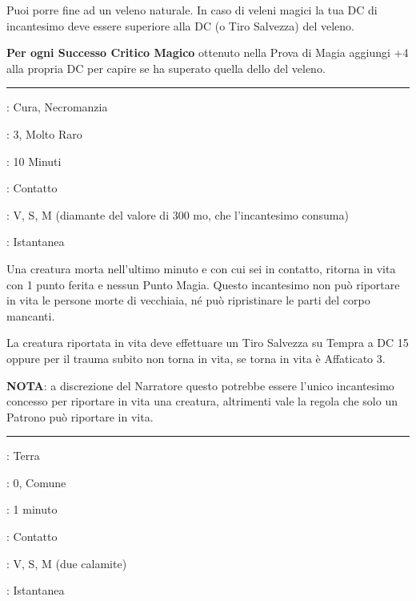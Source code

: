 \begin{multicols}{2}
Puoi porre fine ad un veleno naturale. In caso di veleni magici la tua DC di incantesimo deve essere superiore alla DC (o Tiro Salvezza) del veleno.

\textbf{Per ogni Successo Critico Magico} ottenuto nella Prova di Magia aggiungi +4 alla propria DC per capire se ha superato quella dello del veleno.

\smallskip\noindent\rule{\linewidth}{2pt} \hypertarget{Rinascita}{}\medskip{}
\noindent
\begin{description}[noitemsep, topsep=0pt, parsep=0pt, partopsep=0pt, leftmargin=0cm, labelwidth=2.8cm]
	\item[\textbf{Lista di Magia}]: Cura, Necromanzia
	\item[\textbf{Livello}]: 3, Molto Raro
	\item[\textbf{T. di Lancio}]: 10 Minuti
	\item[\textbf{Gittata}]: Contatto
	\item[\textbf{Componenti}]: V, S, M (diamante del valore di 300 mo, che l'incantesimo consuma)
	\item[\textbf{Durata}]: Istantanea
\end{description}

Una creatura morta nell'ultimo minuto e con cui sei in contatto, ritorna in vita con 1 punto ferita e nessun Punto Magia. Questo incantesimo non può riportare in vita le persone morte di vecchiaia, né può ripristinare le parti del corpo mancanti.

La creatura riportata in vita deve effettuare un Tiro Salvezza su Tempra a DC 15 oppure per il trauma subito non torna in vita, se torna in vita è Affaticato 3.

\textbf{NOTA}: a discrezione del Narratore questo potrebbe essere l'unico incantesimo concesso per riportare in vita una creatura, altrimenti vale la regola che solo un Patrono può riportare in vita.

\smallskip\noindent\rule{\linewidth}{2pt} \hypertarget{Riparare}{}\medskip{}
\noindent
\begin{description}[noitemsep, topsep=0pt, parsep=0pt, partopsep=0pt, leftmargin=0cm, labelwidth=2.8cm]
	\item[\textbf{Lista di Magia}]: Terra
	\item[\textbf{Livello}]: 0, Comune
	\item[\textbf{T. di Lancio}]: 1 minuto
	\item[\textbf{Gittata}]: Contatto
	\item[\textbf{Componenti}]: V, S, M (due calamite)
	\item[\textbf{Durata}]: Istantanea
\end{description}


\end{multicols}
